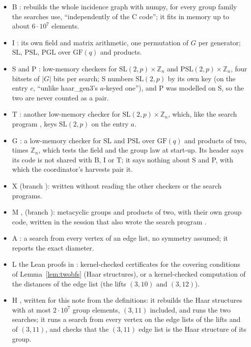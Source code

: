 \documentclass[11pt]{amsart}
\theoremstyle{definition}
\theoremstyle{remark}
\begin{document}
\begin{itemize}[leftmargin=1.5em]
\item B : rebuilds the whole incidence graph with numpy, for every group family the searches use, ``independently of the C code''; it fits in memory up to about $6\cdot10^7$ elements.
\item I : its own field and matrix arithmetic, one permutation of $G$ per generator; $\mathrm{SL}$, $\mathrm{PSL}$, $\mathrm{PGL}$ over $\mathrm{GF}(q)$ and products.
\item S  and P : low-memory checkers for $\mathrm{SL}(2,p)\times\mathbb{Z}_n$ and $\mathrm{PSL}(2,p)\times\mathbb{Z}_n$, four bitsets of $|G|$ bits per search; S numbers $\mathrm{SL}(2,p)$ by its own key (on the entry $c$, ``unlike haar\_gen3's $a$-keyed one''), and P was modelled on S, so the two are never counted as a pair.
\item T : another low-memory checker for $\mathrm{SL}(2,p)\times\mathbb{Z}_n$, which, like the search program , keys $\mathrm{SL}(2,p)$ on the entry $a$.
\item G : a low-memory checker for $\mathrm{SL}$ and $\mathrm{PSL}$ over $\mathrm{GF}(q)$ and products of two, times $\mathbb{Z}_n$, which tests the field and the group law at start-up. Its header says its code is not shared with B, I or T; it says nothing about S and P, with which the coordinator's harvests pair it.
\item X  (branch ): written without reading the other checkers or the search programs.
\item M ,  (branch ): metacyclic groups and products of two, with their own group code, written in the session that also wrote the search program .
\item A : a search from every vertex of an edge list, no symmetry assumed; it reports the exact diameter.
\item L the Lean proofs in : kernel-checked certificates for the covering conditions of Lemma~\ref{lem:twobfs} (Haar structures), or a kernel-checked computation of the distances of the edge list (the lifts $(3,10)$ and $(3,12)$).
\item H , written for this note from the definitions: it rebuilds the Haar structures with at most $2\cdot10^7$ group elements, $(3,11)$ included, and runs the two searches; it runs a search from every vertex on the edge lists of the lifts and of $(3,11)$, and checks that the $(3,11)$ edge list is the Haar structure of its group.
\end{itemize}
\end{document}

